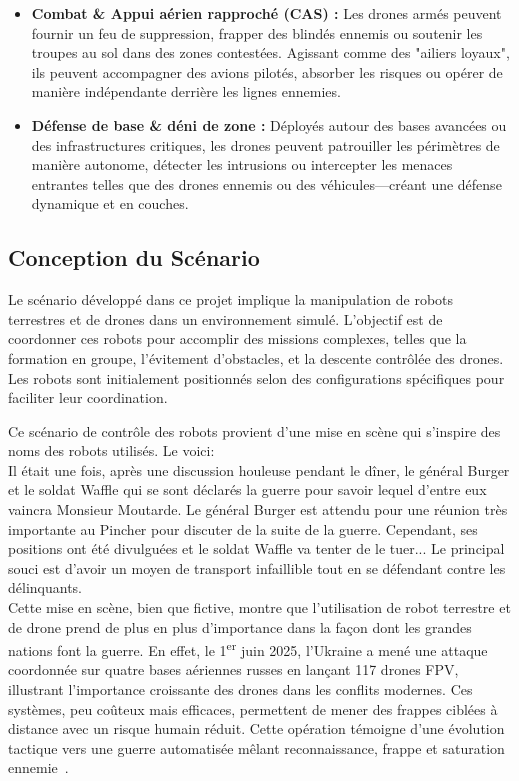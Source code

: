 \documentclass[a4paper,12pt]{article}
\begin{document}
\begin{itemize}
    \item \textbf{Combat \& Appui aérien rapproché (CAS) :}  
    Les drones armés peuvent fournir un feu de suppression, frapper des blindés ennemis ou soutenir les troupes au sol dans des zones contestées. Agissant comme des "ailiers loyaux", ils peuvent accompagner des avions pilotés, absorber les risques ou opérer de manière indépendante derrière les lignes ennemies.

    \item \textbf{Défense de base \& déni de zone :}  
    Déployés autour des bases avancées ou des infrastructures critiques, les drones peuvent patrouiller les périmètres de manière autonome, détecter les intrusions ou intercepter les menaces entrantes telles que des drones ennemis ou des véhicules—créant une défense dynamique et en couches.
\end{itemize}


\subsection*{Conception du Scénario}
Le scénario développé dans ce projet implique la manipulation de robots terrestres et de drones dans un environnement simulé. L'objectif est de coordonner ces robots pour accomplir des missions complexes, telles que la formation en groupe, l'évitement d'obstacles, et la descente contrôlée des drones. Les robots sont initialement positionnés selon des configurations spécifiques pour faciliter leur coordination.

Ce scénario de contrôle des robots provient d'une mise en scène qui s'inspire des noms des robots utilisés. Le voici:\\

Il était une fois, après une discussion houleuse pendant le dîner, le général Burger et le soldat Waffle qui se sont déclarés la guerre pour savoir lequel d'entre eux vaincra Monsieur Moutarde.
Le général Burger est attendu pour une réunion très importante au Pincher pour discuter de la suite de la guerre. Cependant, ses positions ont été divulguées et le soldat Waffle va tenter de le tuer...  Le principal souci est d'avoir un moyen de transport infaillible tout en se défendant contre les délinquants.\\

Cette mise en scène, bien que fictive, montre que l'utilisation de robot terrestre et de drone prend de plus en plus d'importance dans la façon dont les grandes nations font la guerre. 
En effet, le 1\textsuperscript{er} juin 2025, l'Ukraine a mené une attaque coordonnée sur quatre bases aériennes russes en lançant 117 drones FPV, illustrant l'importance croissante des drones dans les conflits modernes. Ces systèmes, peu coûteux mais efficaces, permettent de mener des frappes ciblées à distance avec un risque humain réduit. Cette opération témoigne d'une évolution tactique vers une guerre automatisée mêlant reconnaissance, frappe et saturation ennemie~\cite{lemonde2025}.
\end{document}
